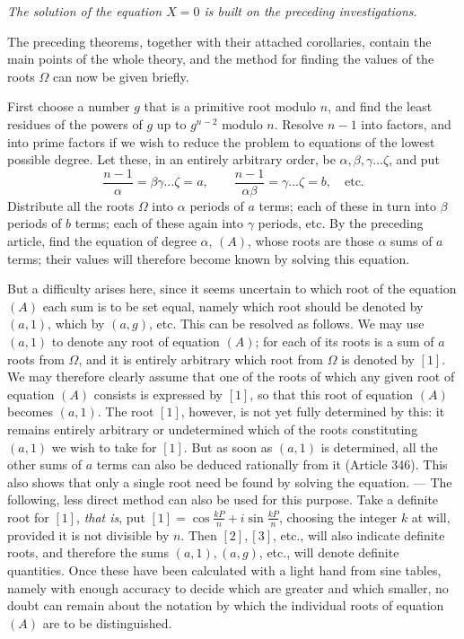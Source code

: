 \begin{center}\textit{The solution of the equation \(X=0\) is built on the preceding investigations.}\end{center}


The preceding theorems, together with their attached corollaries, contain the main points of the whole theory, and the method for finding the values of the roots \(\Omega\) can now be given briefly.

First choose a number \(g\) that is a primitive root modulo \(n\), and find the least residues of the powers of \(g\) up to \(g^{n-2}\) modulo \(n\). Resolve \(n-1\) into factors, and into prime factors if we wish to reduce the problem to equations of the lowest possible degree. Let these, in an entirely arbitrary order, be \(\alpha,\allowbreak \beta,\allowbreak \gamma\ldots\zeta\), and put \[\frac{n-1}{\alpha}=\beta\gamma\ldots\zeta=a,\qquad\frac{n-1}{\alpha\beta}=\gamma\ldots\zeta=b,\quad\text{etc.}\] Distribute all the roots \(\Omega\) into \(\alpha\) periods of \(a\) terms; each of these in turn into \(\beta\) periods of \(b\) terms; each of these again into \(\gamma\) periods, etc. By the preceding article, find the equation of degree \(\alpha\), \((A)\), whose roots are those \(\alpha\) sums of \(a\) terms; their values will therefore become known by solving this equation.

But a difficulty arises here, since it seems uncertain to which root of the equation \((A)\) each sum is to be set equal, namely which root should be denoted by \((a,1)\), which by \((a,g)\), etc. This can be resolved as follows. We may use \((a,1)\) to denote any root of equation \((A)\); for each of its roots is a sum of \(a\) roots from \(\Omega\), and it is entirely arbitrary which root from \(\Omega\) is denoted by \([1]\). We may therefore clearly assume that one of the roots of which any given root of equation \((A)\) consists is expressed by \([1]\), so that this root of equation \((A)\) becomes \((a,1)\). The root \([1]\), however, is not yet fully determined by this: it remains entirely arbitrary or undetermined which of the roots constituting \((a,1)\) we wish to take for \([1]\). But as soon as \((a,1)\) is determined, all the other sums of \(a\) terms can also be deduced rationally from it (Article 346). This also shows that only a single root need be found by solving the equation. — The following, less direct method can also be used for this purpose. Take a definite root for \([1]\), \textit{that is}, put \([1]=\cos\frac{kP}{n}+i\sin\frac{kP}{n}\), choosing the integer \(k\) at will, provided it is not divisible by \(n\). Then \([2],\allowbreak [3]\), etc., will also indicate definite roots, and therefore the sums \((a,1),\allowbreak (a,g)\), etc., will denote definite quantities. Once these have been calculated with a light hand from sine tables, namely with enough accuracy to decide which are greater and which smaller, no doubt can remain about the notation by which the individual roots of equation \((A)\) are to be distinguished.

